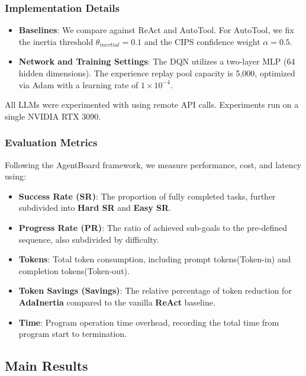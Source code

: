 \documentclass[runningheads]{llncs}
\begin{document}
\subsubsection{Implementation Details}
\begin{itemize}
    \item \textbf{Baselines}: We compare against ReAct and AutoTool. For AutoTool, we fix the inertia threshold $\theta_{inertial}=0.1$ and the CIPS confidence weight $\alpha=0.5$.
    \item \textbf{Network and Training Settings}: The DQN utilizes a two-layer MLP (64 hidden dimensions). The experience replay pool capacity is 5,000, optimized via Adam with a learning rate of $1 \times 10^{-4}$.
\end{itemize}
All LLMs were experimented with using remote API calls. Experiments run on a single NVIDIA RTX 3090.

\subsubsection{Evaluation Metrics}
Following the AgentBoard \cite{agentboard} framework, we measure performance, cost, and latency using:
\begin{itemize}
    \item \textbf{Success Rate (SR)}: The proportion of fully completed tasks, further subdivided into \textbf{Hard SR} and \textbf{Easy SR}.
    \item \textbf{Progress Rate (PR)}: The ratio of achieved sub-goals to the pre-defined sequence, also subdivided by difficulty.
    \item \textbf{Tokens}: Total token consumption, including prompt tokens(Token-in) and completion tokens(Token-out).
    \item \textbf{Token Savings (Savings)}: The relative percentage of token reduction for \textbf{AdaInertia} compared to the vanilla \textbf{ReAct} baseline.
    \item \textbf{Time}: Program operation time overhead, recording the total time from program start to termination.
\end{itemize}

\subsection{Main Results}
\end{document}
